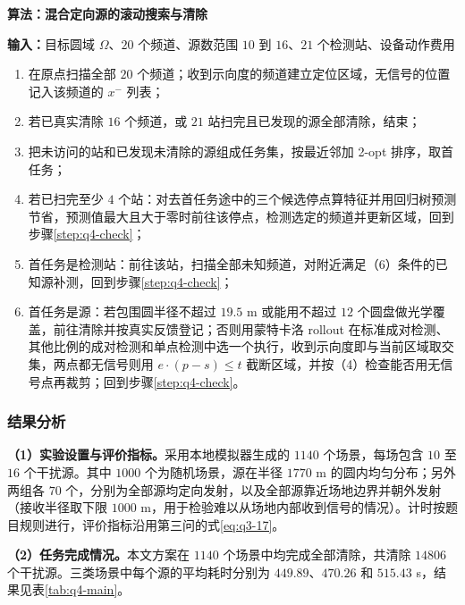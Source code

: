 \par\medskip
\noindent\begin{minipage}{\linewidth}
\small
{}\label{alg:q4-search}
\textbf{算法\thealgorithm：混合定向源的滚动搜索与清除}\par\smallskip
\noindent\textbf{输入：}目标圆域 $\Omega$、$20$ 个频道、源数范围 $10$ 到 $16$、$21$ 个检测站、设备动作费用
\begin{enumerate}
\setlength{\itemsep}{2pt}
\setlength{\parskip}{0pt}
\item 在原点扫描全部 $20$ 个频道；收到示向度的频道建立定位区域，无信号的位置记入该频道的 $x^-$ 列表；
\item\label{step:q4-check} 若已真实清除 $16$ 个频道，或 $21$ 站扫完且已发现的源全部清除，结束；
\item 把未访问的站和已发现未清除的源组成任务集，按最近邻加 2-opt 排序，取首任务；
\item 若已扫完至少 $4$ 个站：对去首任务途中的三个候选停点算特征并用回归树预测节省，预测值最大且大于零时前往该停点，检测选定的频道并更新区域，回到步骤\ref{step:q4-check}；
\item 首任务是检测站：前往该站，扫描全部未知频道，对附近满足（6）条件的已知源补测，回到步骤\ref{step:q4-check}；
\item 首任务是源：若包围圆半径不超过 $19.5$ m 或能用不超过 $12$ 个圆盘做光学覆盖，前往清除并按真实反馈登记；否则用蒙特卡洛 rollout 在标准成对检测、其他比例的成对检测和单点检测中选一个执行，收到示向度即与当前区域取交集，两点都无信号则用 $e\cdot(p-s)\le t$ 截断区域，并按（4）检查能否用无信号点再裁剪；回到步骤\ref{step:q4-check}。
\end{enumerate}
\end{minipage}
\par\medskip

\subsubsection{结果分析}\label{sec:q4-4}

\textbf{（1）实验设置与评价指标。}采用本地模拟器生成的 $1140$ 个场景，每场包含 $10$ 至 $16$ 个干扰源。其中 $1000$ 个为随机场景，源在半径 $1770$ m 的圆内均匀分布；另外两组各 $70$ 个，分别为全部源均定向发射，以及全部源靠近场地边界并朝外发射（接收半径取下限 $1000$ m，用于检验难以从场地内部收到信号的情况）。计时按题目规则进行，评价指标沿用第三问的式\eqref{eq:q3-17}。

\textbf{（2）任务完成情况。}本文方案在 $1140$ 个场景中均完成全部清除，共清除 $14806$ 个干扰源。三类场景中每个源的平均耗时分别为 $449.89$、$470.26$ 和 $515.43$ s，结果见表\ref{tab:q4-main}。

